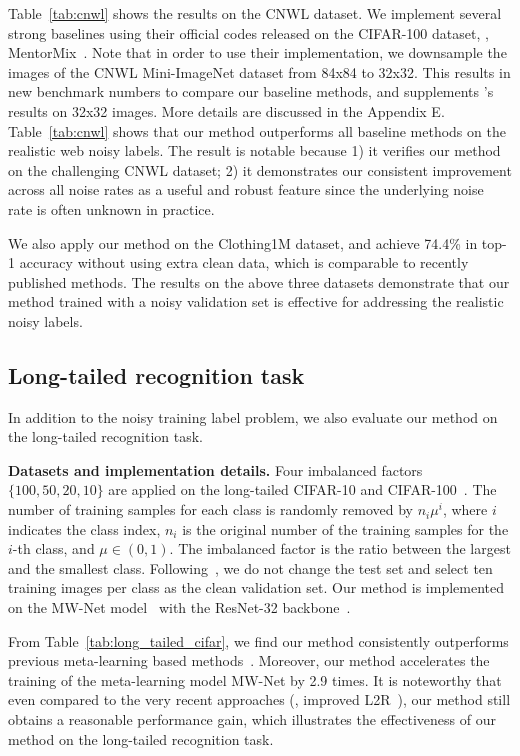 \documentclass[final]{cvpr}
\begin{document}
Table~\ref{tab:cnwl} shows the results on the CNWL dataset. We implement several strong baselines using their official codes released on the CIFAR-100 dataset, \eg, 
MentorMix~\cite{jiang2020beyond}.
Note that in order to use their implementation, we downsample the images of the CNWL Mini-ImageNet dataset from 84x84 to 32x32. This results in new benchmark numbers to compare our baseline methods, and supplements \cite{jiang2020beyond}'s results on 32x32 images.
More details are discussed in the Appendix E.
Table~\ref{tab:cnwl} shows that our method outperforms all baseline methods on the realistic web noisy labels. The result is notable because 1) it verifies our method on the challenging CNWL dataset; 2) it demonstrates our consistent improvement across all noise rates as a useful and robust feature since the underlying noise rate is often unknown in practice.

We also apply our method on the Clothing1M dataset, and achieve 74.4\% in top-1 accuracy without using extra clean data, which is comparable to recently published methods. 
The results on the above three datasets demonstrate that our method trained with a noisy validation set is effective for addressing the realistic noisy labels.




\subsection{Long-tailed recognition task}

\label{sec:exp_longtail}

In addition to the noisy training label problem, we also evaluate our method on the long-tailed recognition task.

\textbf{Datasets and implementation details.} Four imbalanced factors $\{100, 50, 20, 10\}$ are applied on the long-tailed CIFAR-10 and CIFAR-100~\cite{cui2019class}. 
The number of training samples for each class is randomly removed by
$n_i\mu^i$, where $i$ indicates the class index, $n_i$ is the original number of the training samples for the $i$-th class, and $\mu\in(0,1)$. The imbalanced factor is the ratio between the largest and the smallest class. Following~\cite{shu2019meta, Jamal_2020_CVPR}, we do not change the test set and select ten training images per class as the clean validation set. Our method is implemented on the MW-Net model~\cite{shu2019meta} with the ResNet-32 backbone~\cite{he2016deep}.


From Table~\ref{tab:long_tailed_cifar}, we find our method consistently outperforms previous meta-learning based methods~\cite{ren2018learning, shu2019meta, Jamal_2020_CVPR}. 
Moreover, our method accelerates the training of the meta-learning model MW-Net by 2.9 times.
It is noteworthy that even compared to the very recent approaches (\eg, improved L2R~\cite{Jamal_2020_CVPR}), our method still obtains a reasonable performance gain, which illustrates the effectiveness of our method on the long-tailed recognition task.
 
\end{document}
